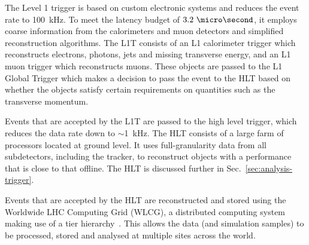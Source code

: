 The Level 1 trigger is based on custom electronic systems and reduces the event 
rate to 100~kHz. To meet the latency budget of $3.2~\micro\second$, it employs 
coarse information from the calorimeters and muon detectors and simplified 
reconstruction algorithms. The L1T consists of an L1 calorimeter trigger which 
reconstructs electrons, photons, jets and missing transverse energy, and an L1 
muon trigger which reconstructs muons. These objects are passed to the L1 
Global Trigger which makes a decision to pass the event to the HLT based on 
whether the objects satisfy certain requirements on quantities such as the 
transverse momentum.

Events that are accepted by the L1T are passed to the high level trigger, which 
reduces the data rate down to $\sim$1~kHz. The HLT consists of a large farm of 
processors located at ground level. It uses full-granularity data from all 
subdetectors, including the tracker, to reconstruct objects with a performance 
that is close to that offline. The HLT is discussed further in 
Sec.~\ref{sec:analysis-trigger}.

Events that are accepted by the HLT are reconstructed and stored using the 
Worldwide LHC Computing Grid (WLCG), a distributed computing system making use 
of a tier hierarchy~\cite{grid}. This allows the data (and simulation samples) 
to be processed, stored and analysed at multiple sites across the world.



